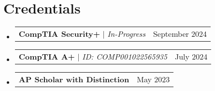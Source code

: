 \documentclass[letterpaper,11pt]{article}
\makeatletter
\newcommand{\resumeProjectHeading}[2]{
    \item
    \begin{tabular*}{0.97\textwidth}{l@{\extracolsep{\fill}}r}
      \small#1 & #2 \\
    \end{tabular*}\vspace{-7pt}
}
\newcommand{\resumeSubHeadingListStart}{\begin{itemize}[leftmargin=0.15in, label={}]}
\newcommand{\resumeSubHeadingListEnd}{\end{itemize}}
\makeatother
\begin{document}
\section{Credentials}
  \resumeSubHeadingListStart
    \resumeProjectHeading
      {\textbf{CompTIA Security+} $|$ \emph{In-Progress}}{September 2024}
    \resumeProjectHeading
      {\textbf{CompTIA A+} $|$ \emph{ID: COMP001022565935}}{July 2024}
    \resumeProjectHeading
      {\textbf{AP Scholar with Distinction}}{May 2023}
  \resumeSubHeadingListEnd



\end{document}
